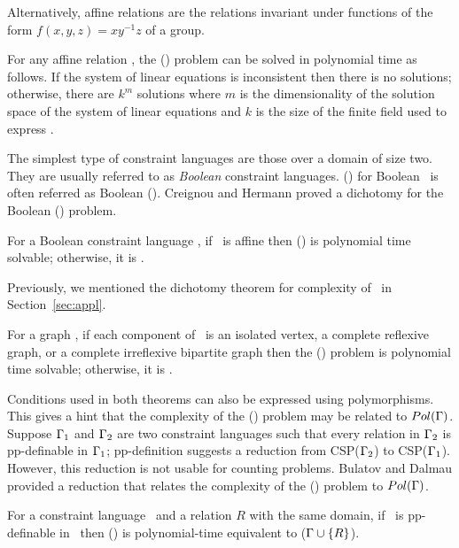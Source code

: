 Alternatively, affine relations are the relations invariant under functions of the form
\(f(x,y,z)=xy^{-1}z\) of a group.

For any affine relation \mR, the \ccsp(\mR) problem can be solved in polynomial time
as follows. If the system of linear equations is inconsistent
then there is no solutions; otherwise, there are \(k^m\) solutions where \(m\) is the
dimensionality of the solution space of the system of linear equations and
\(k\) is the size of the finite field used to express \mR\@.

The simplest type of constraint languages are those 
over a domain of size two. They are usually 
referred to as \emph{Boolean} constraint languages.
\ccsp(\mrelset) for Boolean \mrelset\ is often referred as Boolean \ccsp(\mrelset)\@.
Creignou and Hermann proved a dichotomy for the Boolean \ccsp(\mrelset) problem.

\begin{theorem}  
For a Boolean constraint language \mrelset,
if  \mrelset\ is affine then \ccsp(\mrelset) 
is polynomial time solvable; otherwise, it is \cpc\@.
\end{theorem}

Previously, we mentioned the dichotomy theorem for complexity of \ccsp\ in  Section~\ref{sec:appl}.

\begin{theorem} 
For a graph \mH, if each component of \mH\ is an isolated vertex, a complete reflexive graph,
or a complete irreflexive bipartite graph then the \chom(\mH) problem 
is polynomial time solvable; otherwise, it is \cpc\@.
\end{theorem}

Conditions used in both theorems can also be expressed using polymorphisms. This gives a hint
that the complexity of the \ccsp(\mrelset) problem may be related to \(Pol(\Gamma)\)\@.
Suppose  \(\Gamma_1\) and \(\Gamma_2\) are two constraint languages such that
every relation in \(\Gamma_2\) is pp-definable in \(\Gamma_1\); 
pp-definition suggests a reduction from CSP(\(\Gamma_2\))
to CSP(\(\Gamma_1\))\@. However, this reduction is not usable for counting problems. 
Bulatov and Dalmau provided a reduction that relates 
the complexity of the \ccsp(\mrelset) problem to \(Pol(\Gamma)\)\@.

\begin{theorem} 
For a constraint language \mrelset\ and a relation \(R\) with the same domain,
if \mR\ is pp-definable in \mrelset\ then \ccsp(\mrelset) is polynomial-time equivalent 
to \ccsp(\(\Gamma \cup \{{R}\}\))\@.
\end{theorem}

